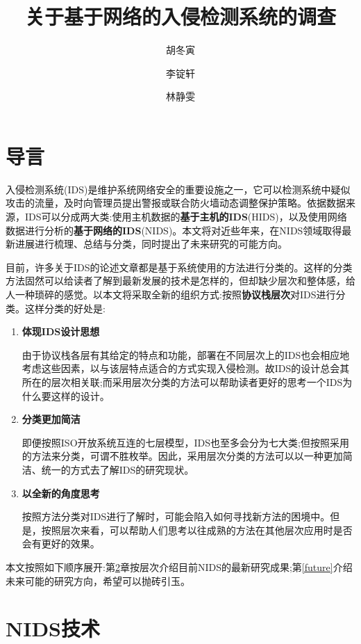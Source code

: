 \documentclass[12pt]{article} %
\title{关于基于网络的入侵检测系统的调查}
\author{胡冬寅 \and 李锭轩 \and 林静雯}
\date{} %
\begin{document}
\maketitle

\section{导言}

入侵检测系统(IDS)是维护系统网络安全的重要设施之一，它可以检测系统中疑似攻击的流量，及时向管理员提出警报或联合防火墙动态调整保护策略。依据数据来源，IDS可以分成两大类:使用主机数据的\textbf{基于主机的IDS}(HIDS)，以及使用网络数据进行分析的\textbf{基于网络的IDS}(NIDS)。本文将对近些年来，在NIDS领域取得最新进展进行梳理、总结与分类，同时提出了未来研究的可能方向。

目前，许多关于IDS的论述文章都是基于系统使用的方法进行分类的。这样的分类方法固然可以给读者了解到最新发展的技术是怎样的，但却缺少层次和整体感，给人一种琐碎的感觉。以本文将采取全新的组织方式:按照\textbf{协议栈层次}对IDS进行分类。这样分类的好处是:

\begin{enumerate}
	\item \textbf{体现IDS设计思想}

	由于协议栈各层有其给定的特点和功能，部署在不同层次上的IDS也会相应地考虑这些因素，以与该层特点适合的方式实现入侵检测。故IDS的设计总会其所在的层次相关联;而采用层次分类的方法可以帮助读者更好的思考一个IDS为什么要这样的设计。

	\item \textbf{分类更加简洁}

	即便按照ISO开放系统互连的七层模型，IDS也至多会分为七大类;但按照采用的方法来分类，可谓不胜枚举。因此，采用层次分类的方法可以以一种更加简洁、统一的方式去了解IDS的研究现状。

	\item \textbf{以全新的角度思考}

	按照方法分类对IDS进行了解时，可能会陷入如何寻找新方法的困境中。但是，按照层次来看，可以帮助人们思考以往成熟的方法在其他层次应用时是否会有更好的效果。
\end{enumerate}

本文按照如下顺序展开:第\ref{main}章按层次介绍目前NIDS的最新研究成果;第\ref{future}介绍未来可能的研究方向，希望可以抛砖引玉。

\section{NIDS技术}
\label{main}
\end{document}
